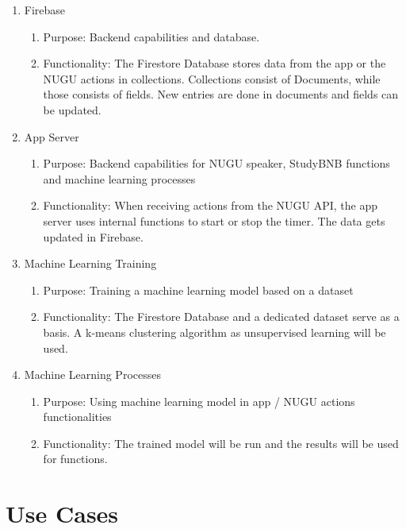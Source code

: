 \documentclass[conference]{IEEEtran}
\begin{document}
\begin{enumerate}
    \item Firebase
    \begin{enumerate}
        \item Purpose: Backend capabilities and database.
        \item Functionality: The Firestore Database stores data from the app or the NUGU actions in collections. Collections consist of Documents, while those consists of fields. New entries are done in documents and fields can be updated.
    \end{enumerate}
    
    \item App Server
    \begin{enumerate}
        \item Purpose: Backend capabilities for NUGU speaker, StudyBNB functions and machine learning processes
        \item Functionality: When receiving actions from the NUGU API, the app server uses internal functions to start or stop the timer. The data gets updated in Firebase.
    \end{enumerate}
    
    \item Machine Learning Training
    \begin{enumerate}
        \item Purpose: Training a machine learning model based on a dataset
        \item Functionality: The Firestore Database and a dedicated dataset serve as a basis. A k-means clustering algorithm as unsupervised learning will be used.
    \end{enumerate}
    
    \item Machine Learning Processes
    \begin{enumerate}
        \item Purpose: Using machine learning model in app / NUGU actions functionalities
        \item Functionality: The trained model will be run and the results will be used for functions.
    \end{enumerate}
    
\end{enumerate}

\section{Use Cases}
\end{document}
